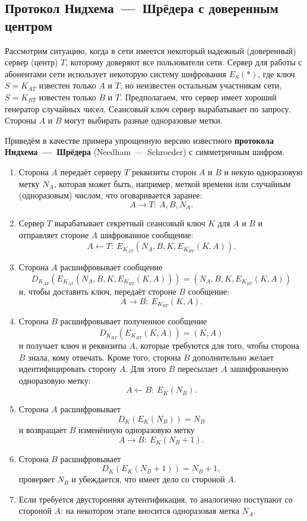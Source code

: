 \subsection{Протокол Нидхема~---~Шрёдера с доверенным центром}

Рассмотрим ситуацию, когда в сети имеется некоторый надежный (доверенный) сервер (центр) $T$, которому доверяют все пользователи сети. Сервер для работы с абонентами сети использует некоторую систему шифрования $E_S(*)$, где ключ $S=K_{AT}$  известен только $A$ и $T$, но неизвестен остальным участникам сети, $S = K_{BT}$ известен только $B$ и  $T$. Предполагаем, что сервер имеет хороший генератор случайных чисел. Сеансовый ключ сервер вырабатывает по запросу. Стороны $A$ и $B$ могут выбирать разные одноразовые метки.

Приведём в качестве примера упрощенную версию известного \textbf{протокола Нидхема~---~Шрёдера} (Needham~---~Schroeder) с симметричным шифром.
\begin{enumerate}
    \item Сторона $A$ передаёт серверу $T$ реквизиты сторон $A$ и $B$  и некую одноразовую метку $N_A$, которая может быть, например, меткой времени или случайным (одноразовым) числом, что оговаривается заранее:
            \[ A \rightarrow T: ~ A, B, N_A. \]
    \item Сервер $T$ вырабатывает секретный сеансовый ключ $K$ для $A$ и $B$ и отправляет стороне $A$ шифрованное сообщение:
            \[ A \leftarrow T: ~ E_{K_{AT}}(N_A, B, K, E_{K_{BT}}(K, A)). \]
    \item Сторона $A$ расшифровывает сообщение
            \[ D_{K_{AT}}( E_{K_{AT}}(N_A, B, K, E_{K_{BT}}(K, A))) = (N_A, B, K, E_{K_{BT}}(K, A)) \]
        и, чтобы доставить ключ, передаёт стороне $B$ сообщение:
            \[ A \rightarrow B: ~ E_{K_{BT}}(K, A). \]
    \item Сторона $B$ расшифровывает полученное сообщение
            \[ D_{K_{BT}}( E_{K_{BT}}( K,A)) = (K,A) \]
        и получает ключ и реквизиты $A$, которые требуются для того, чтобы сторона $B$ знала, кому отвечать. Кроме того, сторона $B$ дополнительно желает идентифицировать сторону $A$. Для этого $B$ пересылает $A$ зашифрованную одноразовую метку:
            \[ A \leftarrow B: ~ E_{K}(N_B). \]
    \item Сторона $A$ расшифровывает
            \[ D_K( E_K( N_B)) = N_B \]
        и возвращает $B$ изменённую одноразовую метку
            \[ A \rightarrow B: ~ E_K(N_B + 1). \]
    \item Сторона $B$ расшифровывает
            \[ D_K( E_K( N_B + 1)) = N_B + 1, \]
        проверяет $N_B$ и убеждается, что имеет дело со стороной $A$.
    \item Если требуется двусторонняя аутентификация, то аналогично поступают со стороной $A$: на некотором этапе вносится одноразовая метка $N_A$.
\end{enumerate}
